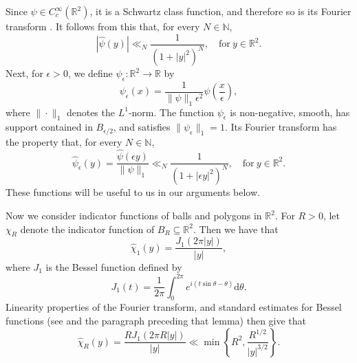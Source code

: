 \documentclass[reqno]{amsart}
\newcommand{\N}{\mathbb{N}}
\newcommand{\R}{\mathbb{R}}
\newcommand{\rar}{\rightarrow}
\newcommand{\mr}{\mathrm}
\begin{document}
Since $\psi\in C_c^\infty(\R^2)$, it is a Schwartz class function, and therefore so is its Fourier transform \cite[Chapter I, Theorem 3.2]{SteiWeis1971}. It follows from this that, for every $N\in\N$,
\[|\widehat{\psi}(y)|\ll_N\frac{1}{(1+|y|^2)^N},\quad\text{for}~ y\in\R^2.\]
Next, for $\epsilon>0$, we define $\psi_\epsilon:\R^2\rar\R$ by
\begin{equation}\label{eqn.PsiEpsDef}
	\psi_\epsilon(x)=\frac{1}{\|\psi\|_1\epsilon^2}\psi\left(\frac{x}{\epsilon}\right),
\end{equation}
where $\|\cdot\|_1$ denotes the $L^1$-norm. The function $\psi_\epsilon$ is non-negative, smooth, has support contained in $B_{\epsilon/2}$, and satisfies $\|\psi_\epsilon\|_1=1$. Its Fourier transform has the property that, for every $N\in\N$,
\begin{equation}\label{eqn.PsiFourEst}
\widehat{\psi}_\epsilon(y)=\frac{\widehat{\psi}(\epsilon y)}{\|\psi\|_1}\ll_N\frac{1}{(1+|\epsilon y|^2)^N},\quad\text{for}~ y\in\R^2.
\end{equation}
These functions will be useful to us in our arguments below.

Now we consider indicator functions of balls and polygons in $\R^2$. For $R>0$, let $\chi_R$ denote the indicator function of $B_R\subseteq\R^2$. Then we have that
\[\widehat{\chi}_1(y)=\frac{J_1(2\pi|y|)}{|y|},\]
where $J_1$ is the Bessel function defined by
\[J_1(t)=\frac{1}{2\pi}\int_{0}^{2\pi} e^{i(t\sin \theta-\theta)}\mr{d}\theta.\]
Linearity properties of the Fourier transform, and standard estimates for Bessel functions (see \cite[Chapter IV, Lemma 3.11]{SteiWeis1971} and the paragraph preceding that lemma) then give that
\begin{equation}\label{eqn.ChiREstimate}
\widehat{\chi}_R(y)=\frac{RJ_1(2\pi R|y|)}{|y|}\ll \min\left\{R^2,\frac{R^{1/2}}{|y|^{3/2}}\right\}.
\end{equation}
\end{document}
